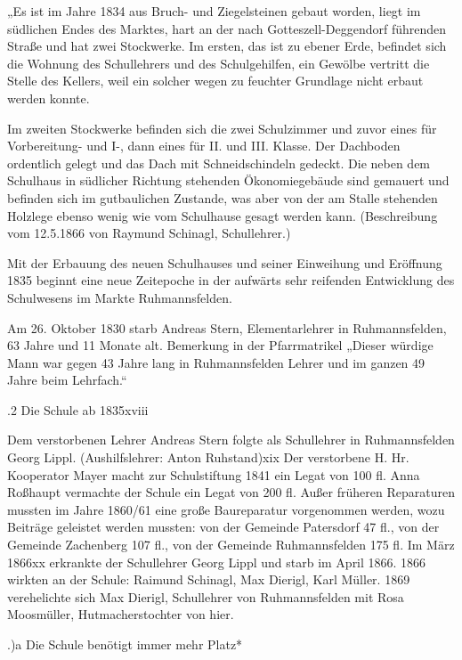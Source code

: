 \documentclass[12pt,a4paper]{book}
\begin{document}
„Es ist im Jahre 1834 aus Bruch- und Ziegelsteinen gebaut worden, liegt im
südlichen Endes des Marktes, hart an der nach Gotteszell-Deggendorf führenden
Straße und hat zwei Stockwerke. Im ersten, das ist zu ebener Erde, befindet sich
die Wohnung des Schullehrers und des Schulgehilfen, ein Gewölbe vertritt die
Stelle des Kellers, weil ein solcher wegen zu feuchter Grundlage nicht erbaut
werden konnte.

Im zweiten Stockwerke befinden sich die zwei Schulzimmer und zuvor eines für
Vorbereitung- und I-, dann eines für II. und III. Klasse. Der Dachboden
ordentlich gelegt und das Dach mit Schneidschindeln gedeckt. Die neben dem
Schulhaus in südlicher Richtung stehenden Ökonomiegebäude sind gemauert und
befinden sich im gutbaulichen Zustande, was aber von der am Stalle stehenden
Holzlege ebenso wenig wie vom Schulhause gesagt werden kann. (Beschreibung vom
12.5.1866 von Raymund Schinagl, Schullehrer.)

Mit der Erbauung des neuen Schulhauses und seiner Einweihung und Eröffnung 1835
beginnt eine neue Zeitepoche in der aufwärts sehr reifenden Entwicklung des
Schulwesens im Markte Ruhmannsfelden.

Am 26. Oktober 1830 starb Andreas Stern, Elementarlehrer in Ruhmannsfelden, 63
Jahre und 11 Monate alt. Bemerkung in der Pfarrmatrikel „Dieser würdige Mann war
gegen 43 Jahre lang in Ruhmannsfelden Lehrer und im ganzen 49 Jahre beim
Lehrfach.“

.2 Die Schule ab 1835xviii

Dem verstorbenen Lehrer Andreas Stern folgte als Schullehrer in Ruhmannsfelden
Georg Lippl. (Aushilfslehrer: Anton Ruhstand)xix Der verstorbene H. Hr.
Kooperator Mayer macht zur Schulstiftung 1841 ein Legat von 100 fl. Anna
Roßhaupt vermachte der Schule ein Legat von 200 fl. Außer früheren Reparaturen
mussten im Jahre 1860/61 eine große Baureparatur vorgenommen werden, wozu
Beiträge geleistet werden mussten: von der Gemeinde Patersdorf 47 fl., von der
Gemeinde Zachenberg 107 fl., von der Gemeinde Ruhmannsfelden 175 fl. Im März
1866xx erkrankte der Schullehrer Georg Lippl und starb im April 1866. 1866
wirkten an der Schule: Raimund Schinagl, Max Dierigl, Karl Müller. 1869
verehelichte sich Max Dierigl, Schullehrer von Ruhmannsfelden mit Rosa
Moosmüller, Hutmacherstochter von hier.

.)a Die Schule benötigt immer mehr Platz*
\end{document}
